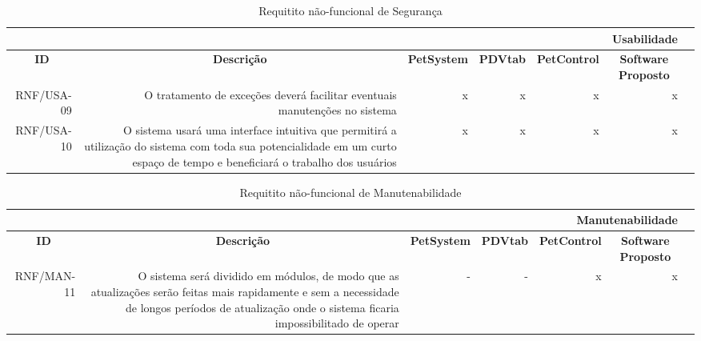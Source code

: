 \documentclass[12pt,openright,twoside,a4paper,english,french,spanish,brazil]{abntex2}
\begin{document}
\begin{table}[htbp]
  \centering
    \begin{tabular}{r|r|r|r|r|rr|}
    \toprule
    \multicolumn{6}{r}{\textbf{Usabilidade}} \\
    \midrule
    \multicolumn{1}{c}{\textbf{ID}} & \multicolumn{1}{c}{\textbf{Descrição}} & \multicolumn{1}{c}{\textbf{PetSystem}} & \multicolumn{1}{c}{\textbf{PDVtab}} & \multicolumn{1}{c}{\textbf{PetControl}} & \multicolumn{1}{c}{\textbf{Software Proposto}} \\
    RNF/USA-09 & O tratamento de exceções deverá facilitar eventuais manutenções no sistema & x & x & x & x \\
    RNF/USA-10 & O sistema usará uma interface intuitiva que permitirá a utilização do sistema com toda sua potencialidade em um curto espaço de tempo e beneficiará o trabalho dos usuários & x & x & x & x \\
    \bottomrule
    \end{tabular}%
      \caption{Requitito não-funcional de Segurança}\label{tab:RNF_SEG}%
\end{table}%


\begin{table}[htbp]
  \centering
    \begin{tabular}{r|r|r|r|r|rr|}
    \toprule
    \multicolumn{6}{r}{\textbf{Manutenabilidade}} \\
    \midrule
    \multicolumn{1}{c}{\textbf{ID}} & \multicolumn{1}{c}{\textbf{Descrição}} & \multicolumn{1}{c}{\textbf{PetSystem}} & \multicolumn{1}{c}{\textbf{PDVtab}} & \multicolumn{1}{c}{\textbf{PetControl}} & \multicolumn{1}{c}{\textbf{Software Proposto}} \\
    RNF/MAN-11 & O sistema será dividido em módulos, de modo que as atualizações serão feitas mais rapidamente e sem a necessidade de longos períodos de atualização onde o sistema ficaria impossibilitado de operar & - & - & x & x \\
    \bottomrule
    \end{tabular}%
      \caption{Requitito não-funcional de Manutenabilidade}\label{tab:RNF_MAN}%
\end{table}%
\end{document}

